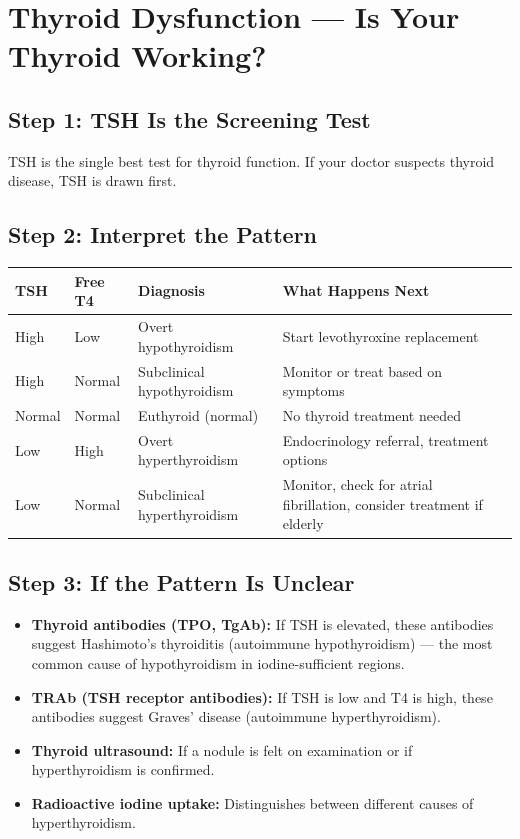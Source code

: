 \clearpage
\section{Thyroid Dysfunction --- Is Your Thyroid Working?}

\subsection{Step 1: TSH Is the Screening Test}

TSH is the single best test for thyroid function. If your doctor suspects thyroid disease, TSH is drawn first.

\subsection{Step 2: Interpret the Pattern}

\begin{longtable}{@{}p{3.5cm}p{3.0cm}p{2.0cm}p{5.5cm}@{}}
\toprule
\textbf{TSH} & \textbf{Free T4} & \textbf{Diagnosis} & \textbf{What Happens Next} \\
\midrule
High & Low & Overt hypothyroidism & Start levothyroxine replacement \\
High & Normal & Subclinical hypothyroidism & Monitor or treat based on symptoms \\
Normal & Normal & Euthyroid (normal) & No thyroid treatment needed \\
Low & High & Overt hyperthyroidism & Endocrinology referral, treatment options \\
Low & Normal & Subclinical hyperthyroidism & Monitor, check for atrial fibrillation, consider treatment if elderly \\
\bottomrule
\end{longtable}

\subsection{Step 3: If the Pattern Is Unclear}

\begin{itemize}
    \item \textbf{Thyroid antibodies (TPO, TgAb):} If TSH is elevated, these antibodies suggest Hashimoto's thyroiditis (autoimmune hypothyroidism) --- the most common cause of hypothyroidism in iodine-sufficient regions.
    \item \textbf{TRAb (TSH receptor antibodies):} If TSH is low and T4 is high, these antibodies suggest Graves' disease (autoimmune hyperthyroidism).
    \item \textbf{Thyroid ultrasound:} If a nodule is felt on examination or if hyperthyroidism is confirmed.
    \item \textbf{Radioactive iodine uptake:} Distinguishes between different causes of hyperthyroidism.
\end{itemize}

